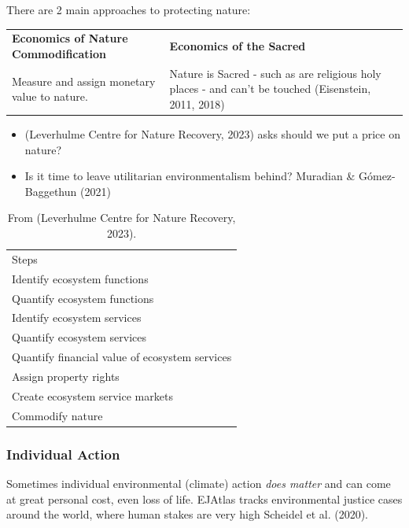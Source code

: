 \documentclass[
  letterpaper,
  DIV=11,
  numbers=noendperiod]{scrartcl}
\providecommand{\tightlist}{%
  \setlength{\itemsep}{0pt}\setlength{\parskip}{0pt}}\usepackage{longtable,booktabs,array}
\begin{document}
There are 2 main approaches to protecting nature:

\begin{longtable}[]{@{}
  >{\raggedright\arraybackslash}p{}
  >{\raggedright\arraybackslash}p{}@{}}
\toprule\noalign{}
\endhead
\bottomrule\noalign{}
\endlastfoot
\textbf{Economics of Nature Commodification} & \textbf{Economics of the
Sacred} \\
Measure and assign monetary value to nature. & Nature is Sacred - such
as are religious holy places - and can't be touched (Eisenstein, 2011,
2018) \\
\end{longtable}

\begin{itemize}
\tightlist
\item
  (Leverhulme Centre for Nature Recovery, 2023) asks should we put a
  price on nature?
\item
  Is it time to leave utilitarian environmentalism behind? Muradian \&
  Gómez-Baggethun (2021)
\end{itemize}

\begin{longtable}[]{@{}l@{}}
\caption{From (Leverhulme Centre for Nature Recovery,
2023).}\tabularnewline
\toprule\noalign{}
\endfirsthead
\endhead
\bottomrule\noalign{}
\endlastfoot
9 Steps \\
Identify ecosystem functions \\
Quantify ecosystem functions \\
Identify ecosystem services \\
Quantify ecosystem services \\
Quantify financial value of ecosystem services \\
Assign property rights \\
Create ecosystem service markets \\
Commodify nature \\
\end{longtable}

\subsubsection{Individual Action}\label{individual-action}

Sometimes individual environmental (climate) action \emph{does matter}
and can come at great personal cost, even loss of life. EJAtlas tracks
environmental justice cases around the world, where human stakes are
very high Scheidel et al. (2020).
\end{document}
